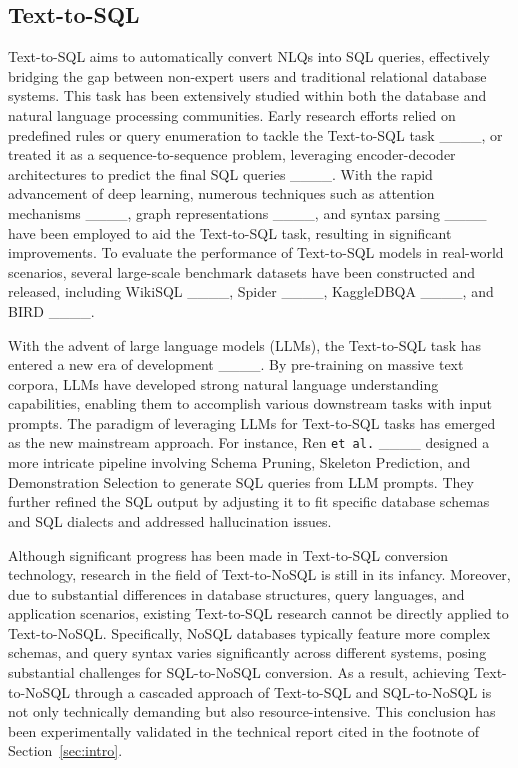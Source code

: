 \subsection{Text-to-SQL}
Text-to-SQL aims to automatically convert NLQs into SQL queries, effectively bridging the gap between non-expert users and traditional relational database systems. This task has been extensively studied within both the database and natural language processing communities. Early research efforts relied on predefined rules or query enumeration to tackle the Text-to-SQL task ____, or treated it as a sequence-to-sequence problem, leveraging encoder-decoder architectures to predict the final SQL queries ____. With the rapid advancement of deep learning, numerous techniques such as attention mechanisms ____, graph representations ____, and syntax parsing ____ have been employed to aid the Text-to-SQL task, resulting in significant improvements. To evaluate the performance of Text-to-SQL models in real-world scenarios, several large-scale benchmark datasets have been constructed and released, including WikiSQL ____, Spider ____, KaggleDBQA ____, and BIRD ____. 

With the advent of large language models (LLMs), the Text-to-SQL task has entered a new era of development ____. By pre-training on massive text corpora, LLMs have developed strong natural language understanding capabilities, enabling them to accomplish various downstream tasks with input prompts. The paradigm of leveraging LLMs for Text-to-SQL tasks has emerged as the new mainstream approach. For instance, Ren \texttt{et al.} ____ designed a more intricate pipeline involving Schema Pruning, Skeleton Prediction, and Demonstration Selection to generate SQL queries from LLM prompts. They further refined the SQL output by adjusting it to fit specific database schemas and SQL dialects and addressed hallucination issues.

Although significant progress has been made in Text-to-SQL conversion technology, research in the field of Text-to-NoSQL is still in its infancy. Moreover, due to substantial differences in database structures, query languages, and application scenarios, existing Text-to-SQL research cannot be directly applied to Text-to-NoSQL. Specifically, NoSQL databases typically feature more complex schemas, and query syntax varies significantly across different systems, posing substantial challenges for SQL-to-NoSQL conversion. As a result, achieving Text-to-NoSQL through a cascaded approach of Text-to-SQL and SQL-to-NoSQL is not only technically demanding but also resource-intensive. This conclusion has been experimentally validated in the technical report cited in the footnote of Section~\ref{sec:intro}.

